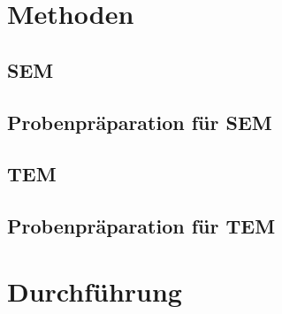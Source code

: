 \section{Methoden}


\subsection{SEM}

\subsection{Probenpräparation für SEM}

\subsection{TEM}

\subsection{Probenpräparation für TEM}

\section{Durchführung}

